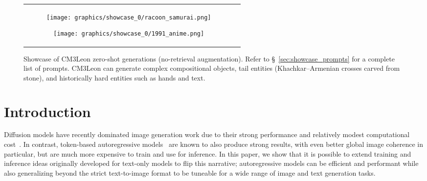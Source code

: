\documentclass{article}
\newcommand{\model}{CM3Leon}
\newcommand{\mm}{multi-modal}
\begin{document}
\begin{figure}[H]
\begin{tabular}{cc}
\begin{subfigure}{0.25\textwidth}
        \end{subfigure}
        \begin{subfigure}{0.25\textwidth}
    \texttt{[image: graphics/showcase\_0/racoon\_samurai.png]}
        \end{subfigure}
        \begin{subfigure}{0.25\textwidth}
    \texttt{[image: graphics/showcase\_0/1991\_anime.png]}
        \end{subfigure}
    \end{tabular}
    \caption{Showcase of \model{} zero-shot generations (no-retrieval augmentation). Refer to \S~\ref{sec:showcase_prompts} for a complete list of prompts. \model{} can generate complex compositional objects, tail entities (Khachkar--Armenian crosses carved from stone), and historically hard entities such as hands and text.}
\end{figure}

\begin{abstract}
We present \model\ (pronounced  ``Chameleon''), a retrieval-augmented, token-based, decoder-only \mm\ language model capable of generating and infilling both text and images. \model\ uses the CM3 \mm\ architecture but additionally shows the extreme benefits of scaling up and tuning on more diverse instruction-style data. It is the first \mm\ model trained with a recipe adapted from text-only language models, including a large-scale retrieval-augmented pretraining stage and a second multi-task supervised fine-tuning (SFT) stage. It is also a general-purpose model that can do both text-to-image and image-to-text generation, allowing us to introduce self-contained contrastive decoding methods that produce high-quality outputs.  
Extensive experiments demonstrate that this recipe is highly effective for \mm\ models. \model\ achieves state-of-the-art performance in text-to-image generation with 5x less training compute than comparable methods (\textbf{zero-shot MS-COCO FID of 4.88}). After SFT, \model\ can also demonstrate unprecedented levels of controllability in tasks ranging from language-guided image editing to image-controlled generation and segmentation.
\end{abstract}


\section{Introduction}

Diffusion models have recently dominated image generation work due to their strong performance and relatively modest computational cost~\citep{IMAGEN, REIMAGEN, LDM}. In contrast, token-based autoregressive models~ \citep{DALLE,PARTI} are known to also produce strong results, with even better global image coherence in particular, but are much more expensive to train and use for inference. In this paper, we show that it is possible to extend training and inference ideas originally developed for text-only models to flip this narrative; autoregressive models can be efficient and performant while also generalizing beyond the strict text-to-image format to be tuneable for a wide range of image and text generation tasks. 
\end{document}

